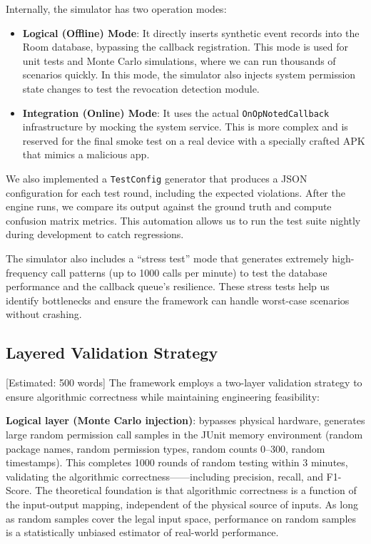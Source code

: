 Internally, the simulator has two operation modes:
\begin{itemize}
\item \textbf{Logical (Offline) Mode}: It directly inserts synthetic event records into the Room database, bypassing the callback registration. This mode is used for unit tests and Monte Carlo simulations, where we can run thousands of scenarios quickly. In this mode, the simulator also injects system permission state changes to test the revocation detection module.
\item \textbf{Integration (Online) Mode}: It uses the actual \texttt{OnOpNotedCallback} infrastructure by mocking the system service. This is more complex and is reserved for the final smoke test on a real device with a specially crafted APK that mimics a malicious app.
\end{itemize}

We also implemented a \texttt{TestConfig} generator that produces a JSON configuration for each test round, including the expected violations. After the engine runs, we compare its output against the ground truth and compute confusion matrix metrics. This automation allows us to run the test suite nightly during development to catch regressions.

The simulator also includes a ``stress test'' mode that generates extremely high-frequency call patterns (up to 1000 calls per minute) to test the database performance and the callback queue's resilience. These stress tests help us identify bottlenecks and ensure the framework can handle worst-case scenarios without crashing.

\subsection{Layered Validation Strategy} [Estimated: 500 words]
The framework employs a two-layer validation strategy to ensure algorithmic correctness while maintaining engineering feasibility:

\textbf{Logical layer (Monte Carlo injection)}: bypasses physical hardware, generates large random permission call samples in the JUnit memory environment (random package names, random permission types, random counts 0--300, random timestamps). This completes 1000 rounds of random testing within 3 minutes, validating the algorithmic correctness——including precision, recall, and F1-Score. The theoretical foundation is that algorithmic correctness is a function of the input-output mapping, independent of the physical source of inputs. As long as random samples cover the legal input space, performance on random samples is a statistically unbiased estimator of real-world performance.

